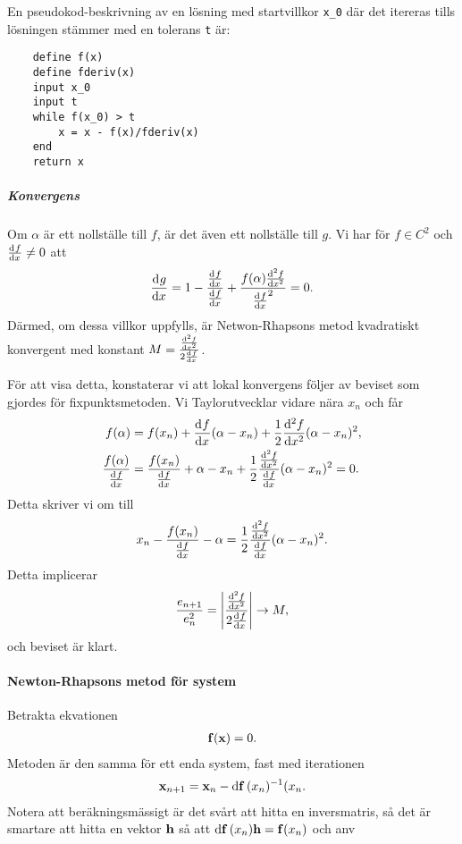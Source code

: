 En pseudokod-beskrivning av en lösning med startvillkor \verb|x_0| där det itereras tills lösningen stämmer med en tolerans \verb|t| är:
\begin{lstlisting}
	define f(x)
	define fderiv(x)
	input x_0
	input t
	while f(x_0) > t
		x = x - f(x)/fderiv(x)
	end
	return x
\end{lstlisting}

\subparagraph{Konvergens}
Om $\alpha$ är ett nollställe till $f$, är det även ett nollställe till $g$. Vi har för $f\in C^{2}$ och $\dv[]{f}{x} (\alpha) \neq 0$ att
\begin{align*}
	\dv[]{g}{x} (\alpha) = 1 - \frac{\dv[]{f}{x} (\alpha)}{\dv[]{f}{x} (\alpha)} + \frac{f(\alpha)\dv[2]{f}{x} (\alpha)}{\dv[]{f}{x} (\alpha)^{2}} = 0.
\end{align*}
Därmed, om dessa villkor uppfylls, är Netwon-Rhapsons metod kvadratiskt konvergent med konstant $M = \frac{\dv[2]{f}{x} (\alpha)}{2\dv[]{f}{x} (\alpha)}$.

För att visa detta, konstaterar vi att lokal konvergens följer av beviset som gjordes för fixpunktsmetoden. Vi Taylorutvecklar vidare nära $x_{n}$ och får
\begin{align*}
	f(\alpha)                            &= f(x_{n}) + \dv[]{f}{x} (x_{n})(\alpha - x_{n}) + \frac{1}{2}\dv[2]{f}{x} (c_{n})(\alpha - x_{n})^{2}, \\
	\frac{f(\alpha)}{\dv[]{f}{x} (x_{n})} &= \frac{f(x_{n})}{\dv[]{f}{x} (x_{n})} + \alpha - x_{n} + \frac{1}{2}\frac{\dv[2]{f}{x} (c_{n})}{\dv[]{f}{x} (x_{n})}(\alpha - x_{n})^{2} = 0.
\end{align*}
Detta skriver vi om till
\begin{align*}
	x_{n} - \frac{f(x_{n})}{\dv[]{f}{x} (x_{n})} - \alpha = \frac{1}{2}\frac{\dv[2]{f}{x} (c_{n})}{\dv[]{f}{x} (x_{n})}(\alpha - x_{n})^{2}.
\end{align*}
Detta implicerar
\begin{align*}
	\frac{e_{n + 1}}{e_{n}^{2}} = \abs{\frac{\dv[2]{f}{x} (c_{n})}{2\dv[]{f}{x} (x_{n})}} \to M,
\end{align*}
och beviset är klart.

\paragraph{Newton-Rhapsons metod för system}
Betrakta ekvationen
\begin{align*}
	\vb{f}(\vb{x}) = 0.
\end{align*}
Metoden är den samma för ett enda system, fast med iterationen
\begin{align*}
	\vb{x}_{n + 1} = \vb{x}_{n} - \dd{\vb{f}}(x_{n})^{-1}(x_{n}.
\end{align*}
Notera att beräkningsmässigt är det svårt att hitta en inversmatris, så det är smartare att hitta en vektor $\vb{h}$ så att $\dd{\vb{f}}(x_{n})\vb{h} = \vb{f}(x_{n})$ och anv